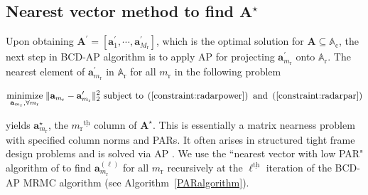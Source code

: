 \documentclass[9pt,journal]{IEEEtran}
\newcommand{\paren}[1]{\left({#1}\right)}
\newcommand{\bracket}[1]{{\left [{#1}\right ]}}
\newcommand{\ith}[1]    {{#1}^{\underline{\text{th}}}}
\newcommand{\rr}{_\mathrm{r}}
\theoremstyle{definition}
\begin{document}
\subsection{Nearest vector method to find $\mathbf{A}^\star$}
\label{subsec: PAR}
Upon obtaining $\mathbf{A}^\prime=\bracket{\mathbf{a}^\prime_{1},\cdots,\mathbf{a}^\prime_{M\rr}}$, which is the optimal solution for $\mathbf{A}\subseteq\mathbb{A}_{\textrm{c}}$, the next step in BCD-AP algorithm is to apply AP for projecting $\mathbf{a}^\prime_{m\rr}$ onto $\mathbb{A}_{\textrm{r}}$. 
The nearest element of $\mathbf{a}^\prime_{m\rr}$ in $\mathbb{A}_{\textrm{r}}$ for all $m\rr$ in the following problem
\par\noindent\small
\begin{equation}
\label{radarmiop}
\underset{\mathbf{a}_{m\rr},\forall m\rr}{\text{minimize}}\;\lVert\mathbf{a}_{m\rr}-\mathbf{a}^\prime_{m\rr}\rVert^2_2\text{ subject to}\;  \paren{\mathrm{\ref{constraint:radarpower}}}\textrm{ and }\paren{\mathrm{\ref{constraint:radarpar}}}
\end{equation}\normalsize

yields $\mathbf{a}^\star_{m\rr}$, the $\ith{m\rr}$ column of $\mathbf{A}^\star$. This is essentially a matrix nearness problem with specified column norms and PARs. It often arises in structured tight frame design problems and is solved via AP \cite{nearestvector,arXiv180203889Z}. We use the ``nearest vector with low PAR" algorithm of \cite{nearestvector} to find $\mathbf{a}^{\paren{\ell}}_{m\rr}$ for all $m\rr$ recursively at the $\ith{\ell}$ iteration of the BCD-AP MRMC algorithm (see Algorithm~\ref{PARalgorithm}).
\end{document}
